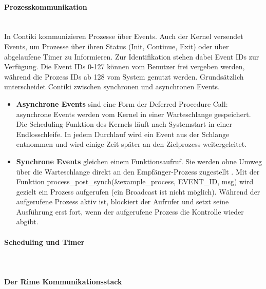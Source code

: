 \paragraph{Prozesskommunikation}\mbox{}\\
In Contiki kommunizieren Prozesse \"uber Events. Auch der Kernel versendet Events, um Prozesse \"uber ihren Status 
(Init, Continue, Exit) oder \"uber abgelaufene Timer zu Informieren. Zur Identifikation stehen dabei Event IDs zur 
Verf\"ugung. Die Event IDs 0-127 k\"onnen vom Benutzer frei vergeben werden, w\"ahrend die Prozess IDs ab 128 vom 
System genutzt werden. Grunds\"atzlich unterscheidet Contiki zwischen synchronen und asynchronen Events. 
\begin{itemize}
\item \textbf{Asynchrone Events} sind eine Form der Deferred Procedure Call: asynchrone Events werden vom Kernel in einer 
Warteschlange gespeichert. Die Scheduling-Funktion des Kernels l\"auft nach Systemstart in einer Endlosschleife. 
In jedem Durchlauf wird ein Event aus der Schlange entnommen und wird einige Zeit sp\"ater an den Zielprozess weitergeleitet.
\item \textbf{Synchrone Events} gleichen einem Funktionsaufruf.
Sie werden ohne Umweg \"uber die Warteschlange direkt an den Empf\"anger-Prozess
zugestellt \cite[vgl.][S. 7]{Walter:2010}.  Mit der Funktion process\_post\_synch(\&example\_process, EVENT\_ID, msg) wird gezielt ein 
Prozess aufgerufen (ein Broadcast ist nicht m\"oglich). W\"ahrend der aufgerufene Prozess aktiv ist, blockiert der Aufrufer und 
setzt seine Ausführung erst fort, wenn der aufgerufene Prozess die Kontrolle wieder abgibt.
\end{itemize}

\paragraph{Scheduling und Timer}\mbox{}\\

\paragraph{Der Rime Kommunikationsstack}\mbox{}\\
\label{sec:rime}



